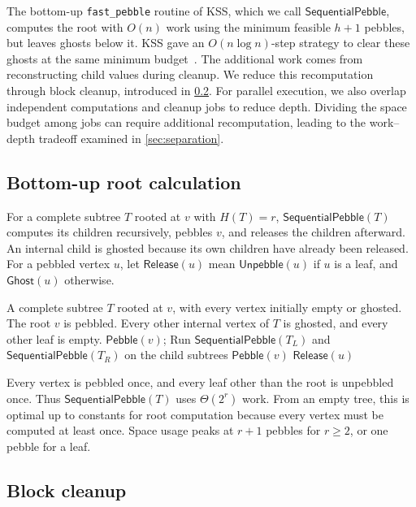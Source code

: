 \documentclass[11pt]{article}
\theoremstyle{definition}
\theoremstyle{remark}
\newcommand{\Peb}{\mathsf{Pebble}}
\newcommand{\Unp}{\mathsf{Unpebble}}
\newcommand{\Ghost}{\mathsf{Ghost}}
\newcommand{\Fast}{\mathsf{SequentialPebble}}
\newcommand{\Release}{\mathsf{Release}}
\begin{document}
The bottom-up \texttt{fast\_pebble} routine of KSS, which we call $\Fast$, computes the root with $O(n)$ work using the minimum feasible $h+1$ pebbles, but leaves ghosts below it. KSS gave an $O(n\log n)$-step strategy to clear these ghosts at the same minimum budget~\cite[Theorem~5.5]{KSS2025}. The additional work comes from reconstructing child values during cleanup. We reduce this recomputation through block cleanup, introduced in
\cref{sec:block-cleanup}. For parallel execution, we also overlap
independent computations and cleanup jobs to reduce depth.
Dividing the space budget among jobs can require additional
recomputation, leading to the work--depth tradeoff examined
in \cref{sec:separation}.


\subsection{Bottom-up root calculation}
\label{sec:fast-root}

For a complete subtree $T$ rooted at $v$ with $H(T)=r$, $\Fast(T)$ computes its children recursively, pebbles $v$, and releases the children afterward. An internal child is ghosted because its own children have already been released. For a pebbled vertex $u$, let $\Release(u)$ mean $\Unp(u)$ if $u$ is a leaf, and $\Ghost(u)$ otherwise.

\begin{algorithm}[H]
\caption{Bottom-up root computation $\Fast(T)$}
\label{alg:fast-root}
\begin{algorithmic}[1]
\Require A complete subtree $T$ rooted at $v$, with every vertex initially empty or ghosted.
\Ensure The root $v$ is pebbled. Every other internal vertex of $T$ is ghosted, and every other leaf is empty.
 \State $\Peb(v)$; \Return
\EndIf
\State Run $\Fast(T_L)$ and $\Fast(T_R)$ on the child subtrees
\State $\Peb(v)$
\State $\Release(u)$
\EndFor
\end{algorithmic}
\end{algorithm}

Every vertex is pebbled once, and every leaf other than the root is unpebbled once. Thus $\Fast(T)$ uses $\Theta(2^r)$ work. From an empty tree, this is optimal up to constants for root computation because every vertex must be computed at least once. Space usage peaks at $r+1$ pebbles for $r\ge2$, or one pebble for a leaf.

\subsection{Block cleanup}
\label{sec:block-cleanup}
\end{document}
